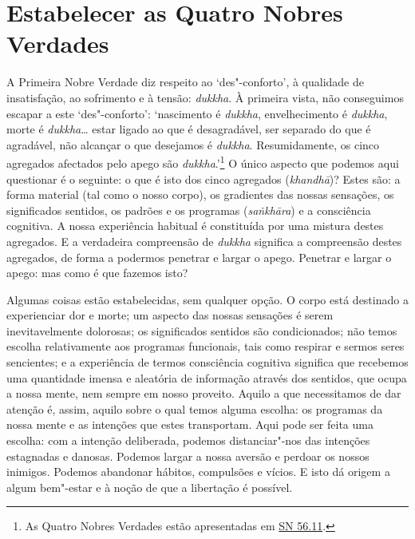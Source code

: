 \section{Estabelecer as Quatro Nobres Verdades}

A Primeira Nobre Verdade diz respeito ao `des"-conforto', à qualidade de insatisfação, ao sofrimento e à tensão: \emph{dukkha}. À primeira vista, não conseguimos escapar a este `des"-conforto': `nascimento é \emph{dukkha}, envelhecimento é \emph{dukkha}, morte é \emph{dukkha}\ldots{} estar ligado ao que é desagradável, ser separado do que é agradável, não alcançar o que desejamos é \emph{dukkha}. Resumidamente, os cinco agregados afectados pelo apego são \emph{dukkha}.'\footnote{As Quatro Nobres Verdades estão apresentadas em \href{https://suttacentral.net/sn56.11/en/bodhi}{SN 56.11}.} O único aspecto que podemos aqui questionar é o seguinte: o que é isto dos cinco agregados (\emph{khandhā})? Estes são: a forma material (tal como o nosso corpo), os gradientes das nossas sensações, os significados sentidos, os padrões e os programas (\emph{saṅkhāra}) e a consciência cognitiva. A nossa experiência habitual é constituída por uma mistura destes agregados. E a verdadeira compreensão de \emph{dukkha} significa a compreensão destes agregados, de forma a podermos penetrar e largar o apego. Penetrar e largar o apego: mas como é que fazemos isto?

Algumas coisas estão estabelecidas, sem qualquer opção. O corpo está destinado a experienciar dor e morte; um aspecto das nossas sensações é serem inevitavelmente dolorosas; os significados sentidos são condicionados; não temos escolha relativamente aos programas funcionais, tais como respirar e sermos seres sencientes; e a experiência de termos consciência cognitiva significa que recebemos uma quantidade imensa e aleatória de informação através dos sentidos, que ocupa a nossa mente, nem sempre em nosso proveito. Aquilo a que necessitamos de dar atenção é, assim, aquilo sobre o qual temos alguma escolha: os programas da nossa mente e as intenções que estes transportam. Aqui pode ser feita uma escolha: com a intenção deliberada, podemos distanciar"-nos das intenções estagnadas e danosas. Podemos largar a nossa aversão e perdoar os nossos inimigos. Podemos abandonar hábitos, compulsões e vícios. E isto dá origem a algum bem"-estar e à noção de que a libertação é possível.

